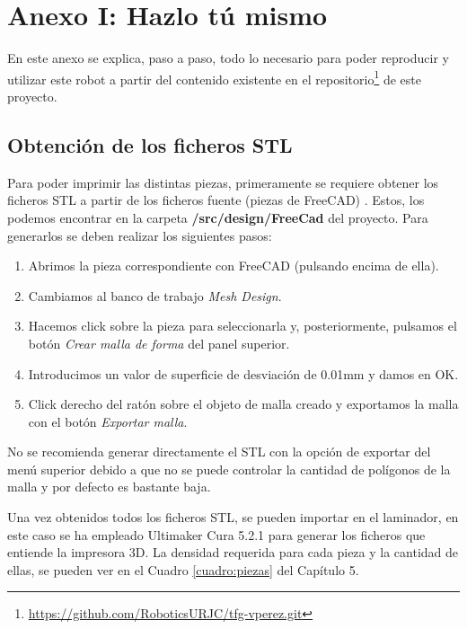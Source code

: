 \chapter*{Anexo I: Hazlo tú mismo}
\label{cap:anexoi}

\noindent En este anexo se explica, paso a paso, todo lo necesario para poder reproducir y utilizar este robot a partir del contenido 
existente en el repositorio\footnote{\url{https://github.com/RoboticsURJC/tfg-vperez.git}} de este proyecto.

\section*{Obtención de los ficheros STL}
\noindent Para poder imprimir las distintas piezas, primeramente se requiere obtener los ficheros STL a partir de los ficheros fuente (piezas de FreeCAD) . 
Estos, los podemos encontrar en la carpeta \textbf{/src/design/FreeCad} del proyecto. Para generarlos se deben realizar los siguientes pasos:
\begin{enumerate}
\item Abrimos la pieza correspondiente con FreeCAD (pulsando encima de ella).
\item Cambiamos al banco de trabajo \textit{Mesh Design}.
\item Hacemos click sobre la pieza para seleccionarla y, posteriormente, pulsamos el botón \textit{Crear malla de forma} del panel superior.
\item Introducimos un valor de superficie de desviación de 0.01mm y damos en OK.
\item Click derecho del ratón sobre el objeto de malla creado y exportamos la malla con el botón \textit{Exportar malla}. 
\end{enumerate}

\begin{tcolorbox}[colback=blue!5!white,colframe=blue!75!black,title=Nota]
    No se recomienda generar directamente el STL con la opción de exportar del menú superior debido a que no se puede controlar la cantidad de polígonos 
    de la malla y por defecto es bastante baja.
\end{tcolorbox}

Una vez obtenidos todos los ficheros STL, se pueden importar en el laminador, en este caso se ha empleado 
Ultimaker Cura 5.2.1 para generar los ficheros que entiende la impresora 3D. La densidad requerida para cada pieza 
y la cantidad de ellas, se pueden ver en el Cuadro \ref{cuadro:piezas} del Capítulo 5.

